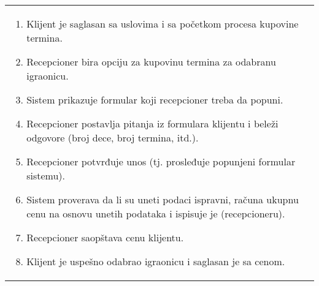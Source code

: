 \documentclass[../../main.tex]{subfiles}
\begin{document}
\begin{longtable}{| p{} | p{} |}
\begin{enumerate}
        \item Klijent je saglasan sa uslovima i sa početkom procesa kupovine termina.
        \item Recepcioner bira opciju za kupovinu termina za odabranu igraonicu.
        \item Sistem prikazuje formular koji recepcioner treba da popuni.
        \item Recepcioner postavlja pitanja iz formulara klijentu i beleži odgovore (broj dece, broj termina, itd.).
        \item Recepcioner potvrđuje unos (tj. prosleđuje popunjeni formular sistemu).
        \item Sistem proverava da li su uneti podaci ispravni, računa ukupnu cenu na osnovu unetih podataka i ispisuje je (recepcioneru).
        \item Recepcioner saopštava cenu klijentu.
        \item Klijent je uspešno odabrao igraonicu i saglasan je sa cenom. %
        

\end{enumerate}
\end{longtable}
\end{document}
